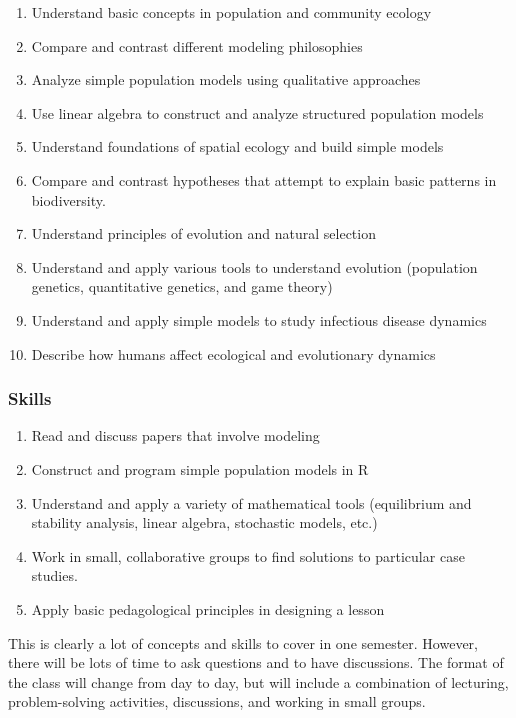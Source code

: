\documentclass[12pt,]{article}
\providecommand{\tightlist}{%
  \setlength{\itemsep}{0pt}\setlength{\parskip}{0pt}}
\begin{document}
\begin{enumerate}
\def\labelenumi{\arabic{enumi}.}
\tightlist
\item
  Understand basic concepts in population and community ecology
\item
  Compare and contrast different modeling philosophies
\item
  Analyze simple population models using qualitative approaches
\item
  Use linear algebra to construct and analyze structured population
  models
\item
  Understand foundations of spatial ecology and build simple models
\item
  Compare and contrast hypotheses that attempt to explain basic patterns
  in biodiversity.
\item
  Understand principles of evolution and natural selection
\item
  Understand and apply various tools to understand evolution (population
  genetics, quantitative genetics, and game theory)
\item
  Understand and apply simple models to study infectious disease
  dynamics
\item
  Describe how humans affect ecological and evolutionary dynamics
\end{enumerate}

\subsubsection{Skills}\label{skills}

\begin{enumerate}
\def\labelenumi{\arabic{enumi}.}
\setcounter{enumi}{10}
\tightlist
\item
  Read and discuss papers that involve modeling
\item
  Construct and program simple population models in R
\item
  Understand and apply a variety of mathematical tools (equilibrium and
  stability analysis, linear algebra, stochastic models, etc.)
\item
  Work in small, collaborative groups to find solutions to particular
  case studies.
\item
  Apply basic pedagological principles in designing a lesson
\end{enumerate}

This is clearly a lot of concepts and skills to cover in one semester.
However, there will be lots of time to ask questions and to have
discussions. The format of the class will change from day to day, but
will include a combination of lecturing, problem-solving activities,
discussions, and working in small groups.
\end{document}
